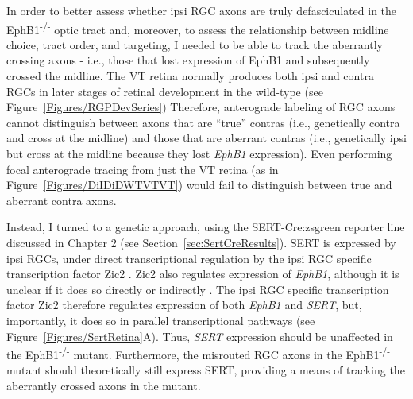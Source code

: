 \label{sec:EphB1Sert}
In order to better assess whether ipsi RGC axons are truly defasciculated in the EphB1\textsuperscript{-/-} optic tract and, moreover, to assess the relationship between midline choice, tract order, and targeting, I needed to be able to track the aberrantly crossing axons - i.e., those that lost expression of EphB1 and subsequently crossed the midline.
The VT retina normally produces both ipsi and contra RGCs in later stages of retinal development in the wild-type (see Figure~\ref{Figures/RGPDevSeries})
Therefore, anterograde labeling of RGC axons cannot distinguish between axons that are ``true'' contras (i.e., genetically contra and cross at the midline) and those that are aberrant contras (i.e., genetically ipsi but cross at the midline because they lost \emph{EphB1} expression).
Even performing focal anterograde tracing from just the VT retina (as in Figure~\ref{Figures/DiIDiDWTVTVT}) would fail to distinguish between true and aberrant contra axons.

Instead, I turned to a genetic approach, using the SERT-Cre:zsgreen reporter line discussed in Chapter 2 (see Section~\ref{sec:SertCreResults}).
SERT is expressed by ipsi RGCs, under direct transcriptional regulation by the ipsi RGC specific transcription factor Zic2 \cite{garcia2010zic2}.
Zic2 also regulates expression of \emph{EphB1}, although it is unclear if it does so directly or indirectly \cite{garcia2010zic2}.
The ipsi RGC specific transcription factor Zic2 therefore regulates expression of both \emph{EphB1} and \emph{SERT}, but, importantly, it does so in parallel transcriptional pathways (see Figure~\ref{Figures/SertRetina}A).
Thus, \emph{SERT} expression should be unaffected in the EphB1\textsuperscript{-/-} mutant.
Furthermore, the misrouted RGC axons in the EphB1\textsuperscript{-/-} mutant should theoretically still express SERT, providing a means of tracking the aberrantly crossed axons in the mutant.

